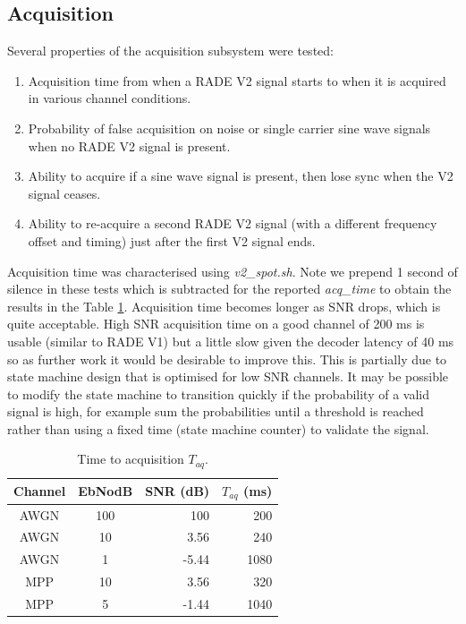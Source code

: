 \documentclass{article}
\begin{document}
\subsection{Acquisition}

Several properties of the acquisition subsystem were tested:
\begin{enumerate}
\item Acquisition time from when a RADE V2 signal starts to when it is acquired in various channel conditions.
\item Probability of false acquisition on noise or single carrier sine wave signals when no RADE V2 signal is present.
\item Ability to acquire if a sine wave signal is present, then lose sync when the V2 signal ceases.
\item Ability to re-acquire a second RADE V2 signal (with a different frequency offset and timing) just after the first V2 signal ends.
\end{enumerate}

Acquisition time was characterised using \emph{v2\_spot.sh}. Note we prepend 1 second of silence in these tests which is subtracted for the reported \emph{acq\_time} to obtain the results in the Table \ref{tab:time_to_acq}.  Acquisition time becomes longer as SNR drops, which is quite acceptable.  High SNR acquisition time on a good channel of 200 \si{ms} is usable (similar to RADE V1) but a little slow given the decoder latency of 40 \si{ms} so as further work it would be desirable to improve this.  This is partially due to state machine design that is optimised for low SNR channels.  It may be possible to modify the state machine to transition quickly if the probability of a valid signal is high, for example sum the probabilities until a threshold is reached rather than using a fixed time (state machine counter) to validate the signal.

\begin{table} [h]
\caption{Time to acquisition $T_{aq}$.}
\label{tab:time_to_acq}
\centering
\begin{tabular}{ c | c | r | r  }
 \hline
 Channel & EbNodB & SNR (\si{dB}) & $T_{aq}$ (ms)\\
 \hline
 AWGN & 100 & 100 & 200 \\
 AWGN & 10 & 3.56 &  240 \\
 AWGN & 1 & -5.44 & 1080 \\
 MPP & 10 & 3.56 & 320 \\
 MPP & 5 & -1.44 & 1040\\
 \hline
\end{tabular}
\end{table}
\end{document}
